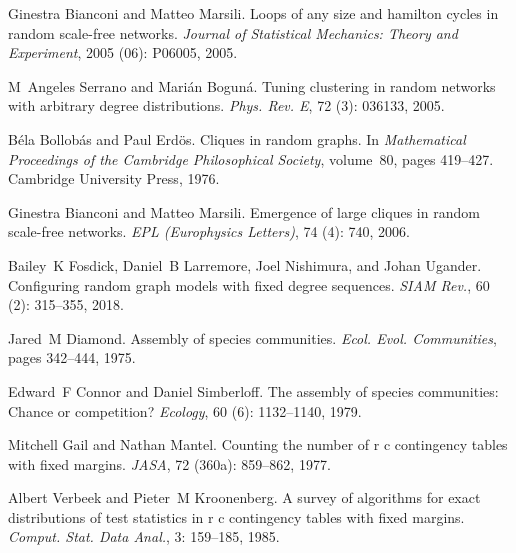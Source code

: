 Ginestra Bianconi and Matteo Marsili.
\newblock Loops of any size and hamilton cycles in random scale-free networks.
\newblock \emph{Journal of Statistical Mechanics: Theory and Experiment},
2005 (06): P06005, 2005.

M~Angeles Serrano and Mari{\'a}n Bogun{\'a}.
\newblock Tuning clustering in random networks with arbitrary degree
distributions.
\newblock \emph{Phys. Rev. E}, 72 (3): 036133, 2005.

B{\'e}la Bollob{\'a}s and Paul Erd{\"o}s.
\newblock Cliques in random graphs.
\newblock In \emph{Mathematical Proceedings of the Cambridge Philosophical
    Society}, volume~80, pages 419--427. {Cambridge University Press}, 1976.

Ginestra Bianconi and Matteo Marsili.
\newblock Emergence of large cliques in random scale-free networks.
\newblock \emph{EPL (Europhysics Letters)}, 74 (4): 740,
2006.

Bailey~K Fosdick, Daniel~B Larremore, Joel Nishimura, and Johan Ugander.
\newblock Configuring random graph models with fixed degree sequences.
\newblock \emph{SIAM Rev.}, 60 (2): 315--355, 2018.

Jared~M Diamond.
\newblock Assembly of species communities.
\newblock \emph{Ecol. Evol. Communities}, pages 342--444, 1975.

Edward~F Connor and Daniel Simberloff.
\newblock The assembly of species communities: Chance or competition?
\newblock \emph{Ecology}, 60 (6): 1132--1140, 1979.

Mitchell Gail and Nathan Mantel.
\newblock Counting the number of r\texttimes{} c contingency tables with fixed
margins.
\newblock \emph{JASA}, 72 (360a): 859--862, 1977.

Albert Verbeek and Pieter~M Kroonenberg.
\newblock A survey of algorithms for exact distributions of test statistics in
r\texttimes{} c contingency tables with fixed margins.
\newblock \emph{Comput. Stat. Data Anal.}, 3: 159--185, 1985.

